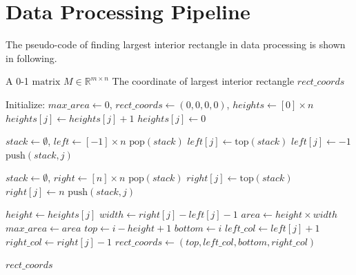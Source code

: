 \documentclass{article}
\begin{document}
\newpage
\section{Data Processing Pipeline}
\label{app:skyreels-data-processing}

The pseudo-code of finding largest interior rectangle in data processing is shown in following.

\begin{algorithm}
\caption{Pseudo-code of finding largest interior rectangle}

\begin{algorithmic}[1]
\Require A 0-1 $\text{matrix}$ $M\in\mathbb{R}^{m \times n}$
\Ensure The coordinate of largest interior rectangle $rect\_coords$


\State Initialize: $max\_area \gets 0$, $rect\_coords \gets (0, 0, 0, 0)$, $heights \gets [0] \times n$
            \State $heights[j] \gets heights[j] + 1$
        \Else
            \State $heights[j] \gets 0$
        \EndIf
    \EndFor
    
    \State $stack \gets \emptyset$, $left \gets [-1] \times n$
            \State $\text{pop}(stack)$
        \EndWhile
            \State $left[j] \gets \text{top}(stack)$
        \Else
            \State $left[j] \gets -1$
        \EndIf
        \State $\text{push}(stack, j)$
    \EndFor
    
    \State $stack \gets \emptyset$, $right \gets [n] \times n$
            \State $\text{pop}(stack)$
        \EndWhile
            \State $right[j] \gets \text{top}(stack)$
        \Else
            \State $right[j] \gets n$
        \EndIf
        \State $\text{push}(stack, j)$
    \EndFor
    
        \State $height \gets heights[j]$
        \State $width \gets right[j] - left[j] - 1$
        \State $area \gets height \times width$
            \State $max\_area \gets area$
            \State $top \gets i - height + 1$
            \State $bottom \gets i$
            \State $left\_col \gets left[j] + 1$
            \State $right\_col \gets right[j] - 1$
            \State $rect\_coords \gets (top, left\_col, bottom, right\_col)$
        \EndIf
    \EndFor
\EndFor

\State \Return $rect\_coords$
\end{algorithmic}
\label{alg:max_inner_rectangle}
\end{algorithm}
\end{document}
